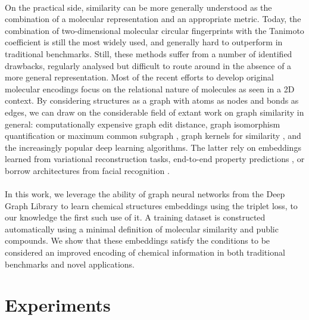 \documentclass[journal=jacsat,manuscript=article]{achemso}
\begin{document}
\paragraph{}
On the practical side, similarity can be more generally understood as the combination of a molecular representation and an appropriate metric\cite{maggiora2014molecular}. Today, the combination of two-dimensional molecular circular fingerprints \cite{cereto2015molecular, rogers2010extended} with the Tanimoto coefficient \cite{bajusz2015tanimoto} is still the most widely used, and  generally hard to outperform in traditional benchmarks\cite{raymond2002effectiveness}. Still, these methods suffer from a number of identified drawbacks, regularly analysed but difficult to route around in the absence of a more general representation\cite{flower1998properties, dixon1999hidden}. Most of the recent efforts to develop original molecular encodings focus on the relational nature of molecules as seen in a 2D context. By considering structures as a graph with atoms as nodes and bonds as edges, we can draw on the considerable field of extant work on graph similarity in general: computationally expensive graph edit distance, graph isomorphism quantification or maximum common subgraph \cite{garcia2019ligand, bunke1998graph, bunke1983inexact, dijkman2009graph, berretti2001efficient}, graph kernels for similarity \cite{kriege2020survey}, and the increasingly popular deep learning algorithms\cite{ma2021deep}. The latter rely on embeddings learned from variational reconstruction tasks\cite{jin2018junction}, end-to-end property predictions \cite{brown2009chemoinformatics}, or borrow architectures from facial recognition \cite{bai2019simgnn}.
\paragraph{}
In this work, we leverage  the ability of graph neural networks from the Deep Graph Library\cite{wang2019deep, li2021dgl} to learn chemical structures embeddings using the triplet loss\cite{schultz2004learning}, to our knowledge the first such use of it. A training dataset is constructed automatically using a minimal definition of molecular similarity and public compounds. We show that these embeddings satisfy the conditions to be considered an improved encoding of chemical information in both traditional benchmarks and novel applications.


\section{Experiments}\label{experiments}
\end{document}
